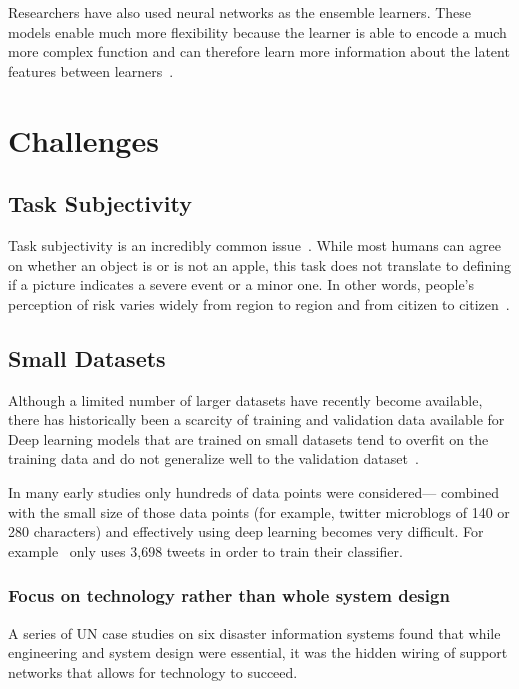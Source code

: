   Researchers have also used neural networks as the ensemble learners. These models enable
  much more flexibility because the learner is able to encode a much more complex
  function and can therefore learn more information about the
  latent features between learners~\cite{jordanHierarchicalMixturesExperts1994}.

\section{Challenges}
\subsection{Task Subjectivity}
Task subjectivity is an incredibly common
issue~\cite{nguyenDamageAssessmentSocial2017,
quarantelliUrbanVulnerabilityDisasters2003}. While most humans can agree on
whether an object is or is not an apple, this task does not translate to
defining if a picture indicates a severe event or a minor one. 
In other words, people's perception of risk varies widely from region to region
and from citizen to citizen~\cite{quarantelliUrbanVulnerabilityDisasters2003}.

\subsection{Small Datasets}
Although a limited number of larger datasets have recently become available, there has
historically been a scarcity of training and validation data available for
Deep learning models that are trained on small datasets tend to overfit on the
training data and do not generalize well to the validation
dataset~\cite{perezEffectivenessDataAugmentation2017,nguyenRapidClassificationCrisisRelated}.

In many early studies only hundreds of data points were considered--- combined
with the small size of those data points (for example, twitter microblogs of
140 or 280 characters) and effectively using deep learning becomes very
difficult. For example~\cite{nagyCrowdSentimentDetection2012} only uses 3,698 tweets in
order to train their classifier.

\subsubsection{Focus on technology rather than whole system design}
A series of UN case studies on six disaster information systems found that while
engineering and system design were essential, it was the hidden wiring of support
networks that allows for technology to succeed.

